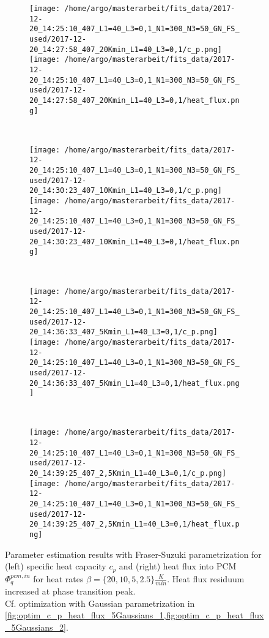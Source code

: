 \documentclass{scrartcl}[12pt, halfparskip]
\numberwithin{equation}{section}
\numberwithin{figure}{section}
\numberwithin{table}{section}
\begin{document}
\begin{figure}[H]
	\begin{subfigure}{1.\textwidth}
		\texttt{[image: /home/argo/masterarbeit/fits\_data/2017-12-20\_14:25:10\_407\_L1=40\_L3=0,1\_N1=300\_N3=50\_GN\_FS\_used/2017-12-20\_14:27:58\_407\_20Kmin\_L1=40\_L3=0,1/c\_p.png]}
		\texttt{[image: /home/argo/masterarbeit/fits\_data/2017-12-20\_14:25:10\_407\_L1=40\_L3=0,1\_N1=300\_N3=50\_GN\_FS\_used/2017-12-20\_14:27:58\_407\_20Kmin\_L1=40\_L3=0,1/heat\_flux.png]}
	\end{subfigure} \\[1ex]
	
	\begin{subfigure}{1.\textwidth}
		\texttt{[image: /home/argo/masterarbeit/fits\_data/2017-12-20\_14:25:10\_407\_L1=40\_L3=0,1\_N1=300\_N3=50\_GN\_FS\_used/2017-12-20\_14:30:23\_407\_10Kmin\_L1=40\_L3=0,1/c\_p.png]}
		\texttt{[image: /home/argo/masterarbeit/fits\_data/2017-12-20\_14:25:10\_407\_L1=40\_L3=0,1\_N1=300\_N3=50\_GN\_FS\_used/2017-12-20\_14:30:23\_407\_10Kmin\_L1=40\_L3=0,1/heat\_flux.png]}
	\end{subfigure} \\[1ex]
	
	\begin{subfigure}{1.\textwidth}
		\texttt{[image: /home/argo/masterarbeit/fits\_data/2017-12-20\_14:25:10\_407\_L1=40\_L3=0,1\_N1=300\_N3=50\_GN\_FS\_used/2017-12-20\_14:36:33\_407\_5Kmin\_L1=40\_L3=0,1/c\_p.png]}
		\texttt{[image: /home/argo/masterarbeit/fits\_data/2017-12-20\_14:25:10\_407\_L1=40\_L3=0,1\_N1=300\_N3=50\_GN\_FS\_used/2017-12-20\_14:36:33\_407\_5Kmin\_L1=40\_L3=0,1/heat\_flux.png]}
	\end{subfigure} \\[1ex]
	
	\begin{subfigure}{1.\textwidth}
		\texttt{[image: /home/argo/masterarbeit/fits\_data/2017-12-20\_14:25:10\_407\_L1=40\_L3=0,1\_N1=300\_N3=50\_GN\_FS\_used/2017-12-20\_14:39:25\_407\_2,5Kmin\_L1=40\_L3=0,1/c\_p.png]}
		\texttt{[image: /home/argo/masterarbeit/fits\_data/2017-12-20\_14:25:10\_407\_L1=40\_L3=0,1\_N1=300\_N3=50\_GN\_FS\_used/2017-12-20\_14:39:25\_407\_2,5Kmin\_L1=40\_L3=0,1/heat\_flux.png]}
	\end{subfigure}
	\caption{Parameter estimation results with Fraser-Suzuki parametrization for (left) specific heat capacity $c_p$ and (right) heat flux into PCM $\varPhi_q^{pcm,in}$ for heat rates $\beta=\{ 20, 10, 5, 2.5 \} \frac{K}{min}$. Heat flux residuum increased at phase transition peak. \\
	Cf. optimization with Gaussian parametrization in \cref{fig:optim_c_p_heat_flux_5Gaussians_1,fig:optim_c_p_heat_flux_5Gaussians_2}.}
	\label{fig:optim_c_p_heat_flux_FS_1}
\end{figure}
\end{document}
